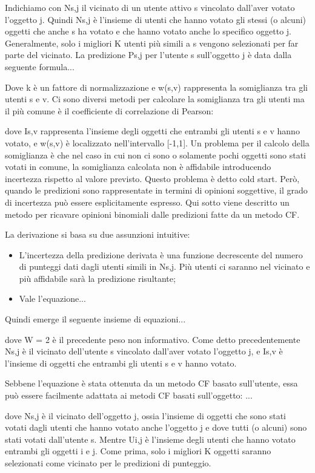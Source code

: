 \documentclass{report}
\begin{document}
	Indichiamo con Ns,j il vicinato di un utente attivo s vincolato
	dall'aver votato l'oggetto j. Quindi Ns,j è l'insieme di utenti che
	hanno votato gli stessi (o alcuni) oggetti che anche s ha votato e che
	hanno votato anche lo specifico oggetto j. Generalmente, solo i migliori
	K utenti più simili a s vengono selezionati per far parte del vicinato.
	La predizione Ps,j per l'utente s sull'oggetto j è data dalla seguente
	formula...
	
	Dove k è un fattore di normalizzazione e w(s,v) rappresenta la
	somiglianza tra gli utenti s e v. Ci sono diversi metodi per calcolare
	la somiglianza tra gli utenti ma il più comune è il coefficiente di
	correlazione di Pearson:
	
	dove Is,v rappresenta l'insieme degli oggetti che entrambi gli utenti s
	e v hanno votato, e w(s,v) è localizzato nell'intervallo {[}-1,1{]}. Un
	problema per il calcolo della somiglianza è che nel caso in cui non ci
	sono o solamente pochi oggetti sono stati votati in comune, la
	somiglianza calcolata non è affidabile introducendo incertezza rispetto
	al valore previsto. Questo problema è detto cold start. Però, quando le
	predizioni sono rappresentate in termini di opinioni soggettive, il
	grado di incertezza può essere esplicitamente espresso. Qui sotto viene
	descritto un metodo per ricavare opinioni binomiali dalle predizioni
	fatte da un metodo CF.
	
	La derivazione si basa su due assunzioni intuitive:
	
	\begin{itemize}
		\item
		L'incertezza della predizione derivata è una funzione decrescente del
		numero di punteggi dati dagli utenti simili in Ns,j. Più utenti ci
		saranno nel vicinato e più affidabile sarà la predizione risultante;
		\item
		Vale l'equazione...
	\end{itemize}
	
	Quindi emerge il seguente insieme di equazioni...
	
	dove W = 2 è il precedente peso non informativo. Come detto
	precedentemente Ns,j è il vicinato dell'utente s vincolato dall'aver
	votato l'oggetto j, e Is,v è l'insieme di oggetti che entrambi gli
	utenti s e v hanno votato.
	
	Sebbene l'equazione è stata ottenuta da un metodo CF basato sull'utente,
	essa può essere facilmente adattata ai metodi CF basati sull'oggetto:
	...
	
	dove Ns,j è il vicinato dell'oggetto j, ossia l'insieme di oggetti che
	sono stati votati dagli utenti che hanno votato anche l'oggetto j e dove
	tutti (o alcuni) sono stati votati dall'utente s. Mentre Ui,j è
	l'insieme degli utenti che hanno votato entrambi gli oggetti i e j. Come
	prima, solo i migliori K oggetti saranno selezionati come vicinato per
	le predizioni di punteggio.
	
\end{document}

